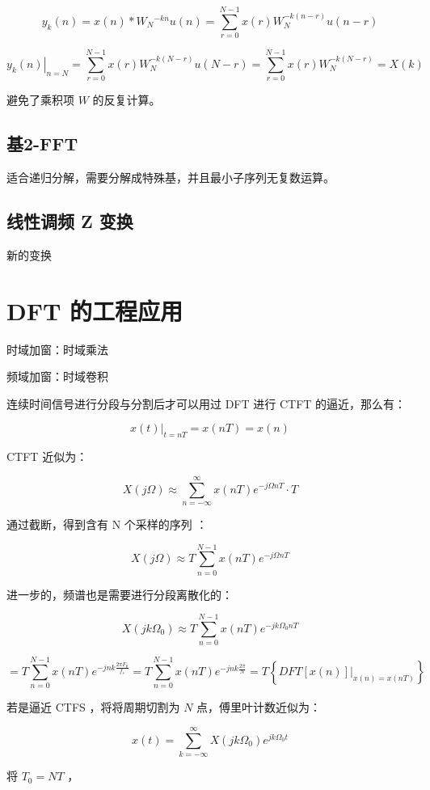 \documentclass[cn,11pt,chinese,black,simple]{../elegantbook}
\begin{document}
\[y_{k}(n)=x(n) * W_{N}{ }^{-k n} u(n) = \sum_{r=0}^{N-1} x(r) W_{N}^{-k(n-r)} u(n-r)\]

\[\left.y_{k}(n)\right|_{n=N}=\sum_{r=0}^{N-1} x(r) W_{N}^{-k(N-r)} u(N-r)=\sum_{r=0}^{N-1} x(r) W_{N}^{-k(N-r)}=X(k)\]

避免了乘积项 \(W\) 的反复计算。

\subsection{基2-FFT}

适合递归分解，需要分解成特殊基，并且最小子序列无复数运算。

\subsection{线性调频 Z 变换}

新的变换

\section{DFT 的工程应用}

时域加窗：时域乘法

频域加窗：时域卷积

连续时间信号进行分段与分割后才可以用过 DFT 进行 CTFT 的逼近，那么有：

\[
\left.x(t)\right|_{t=n T}=x(n T)=x(n)
\]

CTFT 近似为：

\[
X(j \Omega) \approx \sum_{n=-\infty}^{\infty} x(n T) e^{-j \Omega n T} \cdot T
\]

通过截断，得到含有 N 个采样的序列 ：

\[
X(j \Omega) \approx T \sum_{n=0}^{N-1} x(n T) e^{-j \Omega n T}
\]

进一步的，频谱也是需要进行分段离散化的：

\[
X\left(j k \Omega_{0}\right) \approx T \sum_{n=0}^{N-1} x(n T) e^{-j k \Omega_{0} n T}
\]

\[
=T \sum_{n=0}^{N-1} x(n T) e^{-j n k \frac{2 \pi F_{0}}{f_{s}}}=T \sum_{n=0}^{N-1} x(n T) e^{-j n k \frac{2 \pi}{N}}=T\left\{\left.D F T[x(n)]\right|_{x(n)=x(n T)}\right\}
\]

若是逼近 CTFS ，将将周期切割为 \(N\) 点，傅里叶计数近似为：

\[
x(t)=\sum_{k=-\infty}^{\infty} X\left(j k \Omega_{0}\right) e^{j k \Omega_{0} t}
\]

将 \(T_0 = NT\) ，
\end{document}
